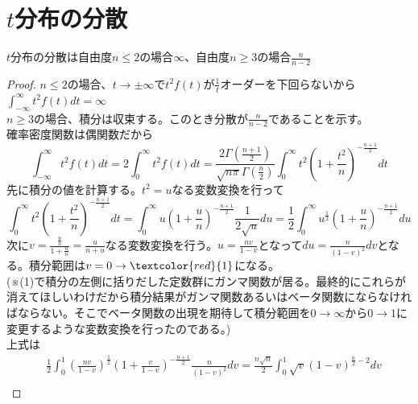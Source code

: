     \section{\texorpdfstring{$t$}{t}分布の分散}
        \begin{shadebox}
            $t$分布の分散は自由度$n \leq 2$の場合$\infty$、自由度$n \geq 3$の場合$\frac{n}{n-2}$
        \end{shadebox}
        \begin{proof}
            \quad\par
            \setcounter{equation}{0}
            $n \leq 2$の場合、$t \to\pm\infty$で$t^2f(t)$が$\frac{1}{t}$オーダーを下回らないから$\int_{-\infty}^{\infty}{t^2f(t) dt} = \infty$ \\
            $n \geq 3$の場合、積分は収束する。このとき分散が$\frac{n}{n-2}$であることを示す。\\
            確率密度関数は偶関数だから
            \begin{equation}
                \int_{-\infty}^{\infty}{t^2f(t) dt} = 2\int_{0}^{\infty}{t^2f(t) dt} = \frac{2\Gamma{\left(\frac{n+1}{2}\right)}}{\sqrt{n\pi}\Gamma{\left(\frac{n}{2}\right)}}\int_{0}^{\infty}{t^2\left(1+\frac{t^2}{n}\right)^{-\frac{n+1}{2}} dt}
            \end{equation}
            先に積分の値を計算する。$t^2 = u$なる変数変換を行って
            \[\int_{0}^{\infty}{t^2\left(1+\frac{t^2}{n}\right)^{-\frac{n+1}{2}} dt} = \int_{0}^{\infty}{u\left(1+\frac{u}{n}\right)^{-\frac{n+1}{2}} \frac{1}{2\sqrt{u}}du} = \frac{1}{2}\int_{0}^{\infty}{u^{\frac{1}{2}}\left(1+\frac{u}{n}\right)^{-\frac{n+1}{2}} du}\]
            次に$\displaystyle v = \frac{\frac{u}{n}}{1+\frac{u}{n}} = \frac{u}{n+u}$なる変数変換を行う。$\displaystyle u = \frac{nv}{1-v}$となって$du = \frac{n}{(1-v)^2}dv$となる。積分範囲は$v=0 \to \textcolor{red}{1}$になる。\\
            (※(1)で積分の左側に括りだした定数群にガンマ関数が居る。最終的にこれらが消えてほしいわけだから積分結果がガンマ関数あるいはベータ関数にならなければならない。そこでベータ関数の出現を期待して積分範囲を$0\to\infty$から$0\to 1$に変更するような変数変換を行ったのである。)\\
            上式は
            \begin{align*}
                & \frac{1}{2}\int_{0}^{1}{\left(\frac{nv}{1-v}\right)^{\frac{1}{2}}\left(1+\frac{v}{1-v}\right)^{-\frac{n+1}{2}}\frac{n}{(1-v)^2} dv} = \frac{n\sqrt{n}}{2}\int_{0}^{1}{\sqrt{v}(1-v)^{\frac{n}{2}-2} dv}\\

\end{align*}
\end{proof}
